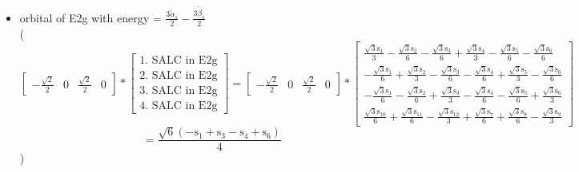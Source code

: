 \documentclass[12pt,a4paper]{article}
\begin{document}
\begin{itemize}
\textcolor{red}{Error in Orthogonalization of SALCs}\item orbital of E2g with energy = 
                                $\frac{3 \tilde{\alpha}_{s}}{2} - \frac{3 \tilde{\beta}_{s}}{2}$ \\
( 
$$
\left[\begin{matrix}- \frac{\sqrt{2}}{2} & 0 & \frac{\sqrt{2}}{2} & 0\end{matrix}\right] * \left[\begin{array}{c}\text{1. SALC in E2g} \\ \text{2. SALC in E2g} \\ \text{3. SALC in E2g} \\ \text{4. SALC in E2g}\end{array}\right] = \left[\begin{matrix}- \frac{\sqrt{2}}{2} & 0 & \frac{\sqrt{2}}{2} & 0\end{matrix}\right] * \left[\begin{matrix}\frac{\sqrt{3} \text{s}_{1}}{3} - \frac{\sqrt{3} \text{s}_{2}}{6} - \frac{\sqrt{3} \text{s}_{3}}{6} + \frac{\sqrt{3} \text{s}_{4}}{3} - \frac{\sqrt{3} \text{s}_{5}}{6} - \frac{\sqrt{3} \text{s}_{6}}{6}\\- \frac{\sqrt{3} \text{s}_{1}}{6} + \frac{\sqrt{3} \text{s}_{2}}{3} - \frac{\sqrt{3} \text{s}_{3}}{6} - \frac{\sqrt{3} \text{s}_{4}}{6} + \frac{\sqrt{3} \text{s}_{5}}{3} - \frac{\sqrt{3} \text{s}_{6}}{6}\\- \frac{\sqrt{3} \text{s}_{1}}{6} - \frac{\sqrt{3} \text{s}_{2}}{6} + \frac{\sqrt{3} \text{s}_{3}}{3} - \frac{\sqrt{3} \text{s}_{4}}{6} - \frac{\sqrt{3} \text{s}_{5}}{6} + \frac{\sqrt{3} \text{s}_{6}}{3}\\\frac{\sqrt{3} \text{s}_{10}}{6} + \frac{\sqrt{3} \text{s}_{11}}{6} - \frac{\sqrt{3} \text{s}_{12}}{3} + \frac{\sqrt{3} \text{s}_{7}}{6} + \frac{\sqrt{3} \text{s}_{8}}{6} - \frac{\sqrt{3} \text{s}_{9}}{3}\end{matrix}\right] 
 $$ $$ = \frac{\sqrt{6} \left(- \text{s}_{1} + \text{s}_{3} - \text{s}_{4} + \text{s}_{6}\right)}{4} 
 $$ 
 )


\end{itemize}
\end{document}
